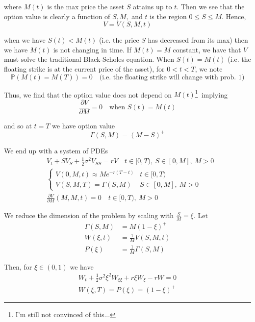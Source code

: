 \documentclass[12pt]{article}
\renewcommand{\P}{\mathbb P}
\begin{document}
where $M(t)$ is the max price the asset $S$ attains up to $t$. Then we see that the option value is clearly a function of $S, M,$ and $t$ is the region $0 \leq S \leq M$. Hence,
\begin{equation*}
	V = V(S, M, t)
\end{equation*}

when we have $S(t) < M(t)$ (i.e. the price $S$ has decreased from its max) then we have $M(t)$ is not changing in time. If $M(t) = M$ constant, we have that $V$ must solve the traditional Black-Scholes equation. When $S(t) = M(t)$ (i.e. the floating strike is at the current price of the asset), for $0 < t < T$, we note
\begin{equation*}
	\P\left( M(t) = M(T) \right) = 0 \quad \text{(i.e. the floating strike will change with prob. 1)}
\end{equation*}

Thus, we find that the option value does not depend on $M(t)$\footnote{I'm still not convinced of this...}~implying
\begin{equation*}
	\frac{\partial V}{\partial M} = 0 \quad \text{when } S(t) = M(t)
\end{equation*}

and so at $t = T$ we have option value
\begin{equation*}
	\Gamma(S, M) = (M - S)^+
\end{equation*}

We end up with a system of PDEs
\begin{align*}
	&V_t + SV_S + \frac{1}{2}\sigma^2 V_{SS} = rV \quad t \in [0, T),~S \in [0,M],~M > 0 \\
	&\begin{cases}
		V(0, M, t) \approx M e^{-r(T - t)} & t \in [0, T) \\
		V(S, M, T) = \Gamma(S, M) & S \in [0, M],~M > 0
	\end{cases} \\
	&\frac{\partial V}{\partial M}(M, M, t) = 0 \quad t \in [0, T),~M > 0
\end{align*}

We reduce the dimension of the problem by scaling with $\frac{S}{M} = \xi$. Let
\begin{align*}
	\Gamma(S, M) &= M(1 - \xi)^+ \\
	W(\xi, t) &= \frac{1}{M}V(S, M, t) \\
	P(\xi) &= \frac{1}{M}\Gamma(S, M)
\end{align*}

Then, for $\xi \in (0, 1)$ we have
\begin{align*}
	W_t + \frac{1}{2}\sigma^2\xi^2 W_{\xi\xi} + r\xi W_\xi - rW = 0 \\
	W(\xi, T) = P(\xi) = (1 - \xi)^+
\end{align*}
\end{document}
